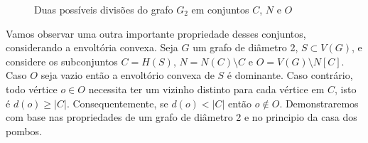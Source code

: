\begin{figure}[h]
\caption{Duas possíveis divisões do grafo $G_2$ em conjuntos $C$, $N$ e $O$}
\label{fig:blocos-d2-g2}
\end{figure}


Vamos observar uma outra importante propriedade desses conjuntos, considerando a envoltória convexa. Seja $G$ um grafo de diâmetro 2, $S\subset V(G)$, e considere os subconjuntos $C=H(S)$, $N=N(C) \setminus C$ e $O= V(G) \setminus N[C]$. Caso $O$ seja vazio então a envoltório convexa de $S$ é dominante. Caso contrário, todo vértice $o \in O$ necessita ter um vizinho distinto para cada vértice em $C$, isto é $d(o)\ge |C|$. Consequentemente, se $d(o) < |C|$ então $o\not\in O$. Demonstraremos com base nas propriedades de um grafo de diâmetro 2 e no principio da casa dos pombos.

